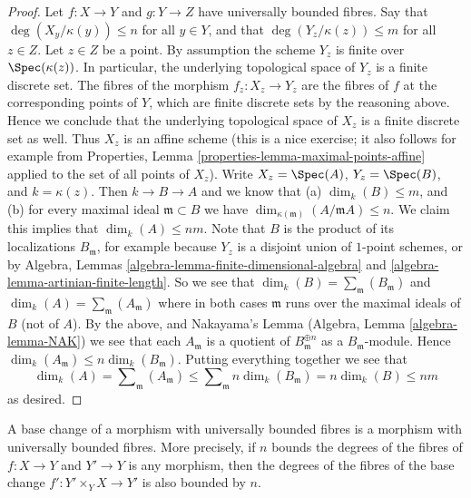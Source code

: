 \begin{proof}
Let $f : X \to Y$ and $g : Y \to Z$ have universally bounded fibres.
Say that $\deg(X_y/\kappa(y)) \leq n$ for all $y \in Y$, and that
$\deg(Y_z/\kappa(z)) \leq m$ for all $z \in Z$.
Let $z \in Z$ be a point. By assumption the scheme
$Y_z$ is finite over $\Spec(\kappa(z))$.
In particular, the underlying topological space of $Y_z$
is a finite discrete set. The fibres of the morphism
$f_z : X_z \to Y_z$ are the fibres of $f$ at the corresponding
points of $Y$, which are finite discrete sets by the reasoning above.
Hence we conclude that the underlying topological space
of $X_z$ is a finite discrete set as well. Thus $X_z$ is an affine
scheme (this is a nice exercise; it also follows for example from
Properties, Lemma \ref{properties-lemma-maximal-points-affine}
applied to the set of all points of $X_z$). Write $X_z = \Spec(A)$,
$Y_z = \Spec(B)$, and $k = \kappa(z)$. Then $k \to B \to A$
and we know that (a) $\dim_k(B) \leq m$, and (b) for every maximal
ideal $\mathfrak m \subset B$ we have
$\dim_{\kappa(\mathfrak m)}(A/\mathfrak mA) \leq n$.
We claim this implies that $\dim_k(A) \leq nm$.
Note that $B$ is the product of its localizations $B_{\mathfrak m}$, for
example because $Y_z$ is a disjoint union of $1$-point schemes, or by
Algebra, Lemmas \ref{algebra-lemma-finite-dimensional-algebra} and
\ref{algebra-lemma-artinian-finite-length}.
So we see that
$\dim_k(B) = \sum_{\mathfrak m}(B_{\mathfrak m})$ and
$\dim_k(A) = \sum_{\mathfrak m}(A_{\mathfrak m})$ where
in both cases $\mathfrak m$ runs over the maximal ideals of
$B$ (not of $A$). By the above, and Nakayama's Lemma
(Algebra, Lemma \ref{algebra-lemma-NAK})
we see that each $A_{\mathfrak m}$ is a quotient of
$B_{\mathfrak m}^{\oplus n}$ as a $B_{\mathfrak m}$-module. Hence
$\dim_k(A_{\mathfrak m}) \leq n \dim_k(B_{\mathfrak m})$. Putting
everything together we see that
$$
\dim_k(A) = \sum\nolimits_{\mathfrak m}(A_{\mathfrak m})
\leq \sum\nolimits_{\mathfrak m} n \dim_k(B_{\mathfrak m})
= n \dim_k(B) \leq nm
$$
as desired.
\end{proof}

\begin{lemma}
\label{lemma-base-change-universally-bounded}
A base change of a morphism with universally bounded fibres is
a morphism with universally bounded fibres. More precisely, if
$n$ bounds the degrees of the fibres of $f : X \to Y$ and $Y' \to Y$
is any morphism, then the degrees of the fibres of the base change
$f' : Y' \times_Y X \to Y'$ is also bounded by $n$.
\end{lemma}

